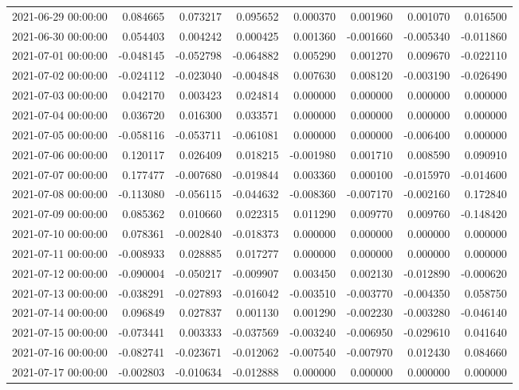\begin{tabular}{lrrrrrrr}
2021-06-29 00:00:00 & 0.084665 & 0.073217 & 0.095652 & 0.000370 & 0.001960 & 0.001070 & 0.016500 \\
2021-06-30 00:00:00 & 0.054403 & 0.004242 & 0.000425 & 0.001360 & -0.001660 & -0.005340 & -0.011860 \\
2021-07-01 00:00:00 & -0.048145 & -0.052798 & -0.064882 & 0.005290 & 0.001270 & 0.009670 & -0.022110 \\
2021-07-02 00:00:00 & -0.024112 & -0.023040 & -0.004848 & 0.007630 & 0.008120 & -0.003190 & -0.026490 \\
2021-07-03 00:00:00 & 0.042170 & 0.003423 & 0.024814 & 0.000000 & 0.000000 & 0.000000 & 0.000000 \\
2021-07-04 00:00:00 & 0.036720 & 0.016300 & 0.033571 & 0.000000 & 0.000000 & 0.000000 & 0.000000 \\
2021-07-05 00:00:00 & -0.058116 & -0.053711 & -0.061081 & 0.000000 & 0.000000 & -0.006400 & 0.000000 \\
2021-07-06 00:00:00 & 0.120117 & 0.026409 & 0.018215 & -0.001980 & 0.001710 & 0.008590 & 0.090910 \\
2021-07-07 00:00:00 & 0.177477 & -0.007680 & -0.019844 & 0.003360 & 0.000100 & -0.015970 & -0.014600 \\
2021-07-08 00:00:00 & -0.113080 & -0.056115 & -0.044632 & -0.008360 & -0.007170 & -0.002160 & 0.172840 \\
2021-07-09 00:00:00 & 0.085362 & 0.010660 & 0.022315 & 0.011290 & 0.009770 & 0.009760 & -0.148420 \\
2021-07-10 00:00:00 & 0.078361 & -0.002840 & -0.018373 & 0.000000 & 0.000000 & 0.000000 & 0.000000 \\
2021-07-11 00:00:00 & -0.008933 & 0.028885 & 0.017277 & 0.000000 & 0.000000 & 0.000000 & 0.000000 \\
2021-07-12 00:00:00 & -0.090004 & -0.050217 & -0.009907 & 0.003450 & 0.002130 & -0.012890 & -0.000620 \\
2021-07-13 00:00:00 & -0.038291 & -0.027893 & -0.016042 & -0.003510 & -0.003770 & -0.004350 & 0.058750 \\
2021-07-14 00:00:00 & 0.096849 & 0.027837 & 0.001130 & 0.001290 & -0.002230 & -0.003280 & -0.046140 \\
2021-07-15 00:00:00 & -0.073441 & 0.003333 & -0.037569 & -0.003240 & -0.006950 & -0.029610 & 0.041640 \\
2021-07-16 00:00:00 & -0.082741 & -0.023671 & -0.012062 & -0.007540 & -0.007970 & 0.012430 & 0.084660 \\
2021-07-17 00:00:00 & -0.002803 & -0.010634 & -0.012888 & 0.000000 & 0.000000 & 0.000000 & 0.000000 \\

\end{tabular}
